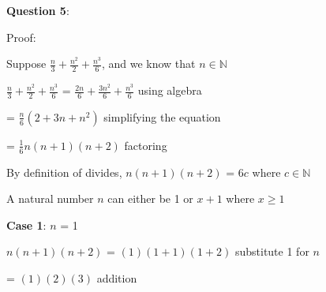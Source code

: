 \documentclass{article} %
\newcommand{\question}[2][]{\begin{flushleft}
        \textbf{Question #1}: \textit{#2}

\end{flushleft}}
\begin{document}


    \newpage


    \question[5]{}


    Proof:

    Suppose $\frac{n}{3} + \frac{n^2}{2} + \frac{n^3}{6}$, and we know that $n \in \mathbb{N}$

    $\frac{n}{3} + \frac{n^2}{2} + \frac{n^3}{6}$ = $\frac{2n}{6} + \frac{3n^2}{6} + \frac{n^3}{6}$ \tabto*{6cm}using algebra
    
    \vspace*{0.08cm}

    \tabto*{2.57cm} = $\frac{n}{6}(2 + 3n + n^2)$ \tabto*{6cm}simplifying the equation

    \vspace*{0.08cm}

    \tabto*{2.57cm} = $\frac{1}{6}n(n + 1)(n + 2)$ \tabto*{6cm}factoring
    
    \vspace*{0.08cm}

    By definition of divides, $n(n + 1)(n + 2)$ = 6$c$ where $c \in \mathbb{N}$

    A natural number $n$ can either be 1 or $x+1$ where $x \geq 1$

    \vspace*{0.2cm}

    \textbf{Case 1}: $n$ = 1

    \tabto*{1cm}$n(n + 1)(n + 2)$ = $(1)(1 + 1)(1 + 2)$ \tabto*{7.3cm}substitute 1 for $n$

    \vspace*{0.08cm}

    \tabto*{1cm}\tabto*{3.51cm} = $(1)(2)(3)$ \tabto*{7.3cm}addition
    
    \vspace*{0.08cm}
\end{document}
